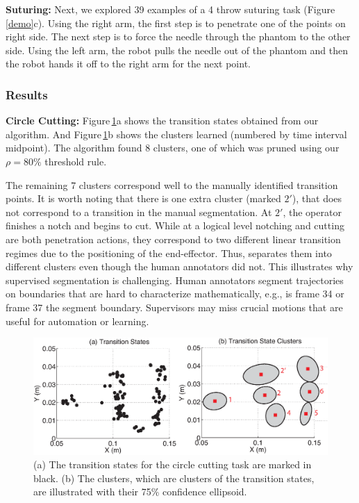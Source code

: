 \vspace{0.5em}

\noindent\textbf{Suturing: }Next, we explored 39 examples of a 4 throw suturing task (Figure \ref{demo}c). Using the right arm, the first step is to penetrate one of the points on right side. The next step is to force the needle through the phantom to the other side. Using the left arm, the robot pulls the needle out of the phantom and then the robot hands it off to the right arm for the next point. 



\subsubsection{Results}\label{results:real}

\noindent\textbf{Circle Cutting: }
Figure\,\ref{exp:circ}a shows the transition states obtained from our algorithm. And Figure\,\ref{exp:circ}b shows the \tsc clusters learned (numbered by time interval midpoint).
The algorithm found 8 clusters, one of which was pruned using our $\rho=80\%$ threshold rule.

The remaining 7 clusters correspond well to the manually identified transition points.
It is worth noting that there is one extra cluster (marked $2'$), that does not correspond to a transition in the manual segmentation.
At $2'$, the operator finishes a notch and begins to cut.
While at a logical level notching and cutting are both penetration actions, they correspond to two different linear transition regimes due to the positioning of the end-effector.
Thus, \tsc separates them into different clusters even though the human annotators did not.
This illustrates why supervised segmentation is challenging.
Human annotators segment trajectories on boundaries that are hard to characterize mathematically, e.g., is frame 34 or frame 37 the segment boundary.
Supervisors may miss crucial motions that are useful for automation or learning.

\begin{figure}[ht!]
    \includegraphics[width=\columnwidth]{tsc-experiments/new_circle_cutting}
    \caption{(a) The transition states for the circle cutting task are marked in black. (b) The \tsc clusters, which are clusters of the transition states, are illustrated with their 75\% confidence ellipsoid.\label{exp:circ}}
\end{figure}



